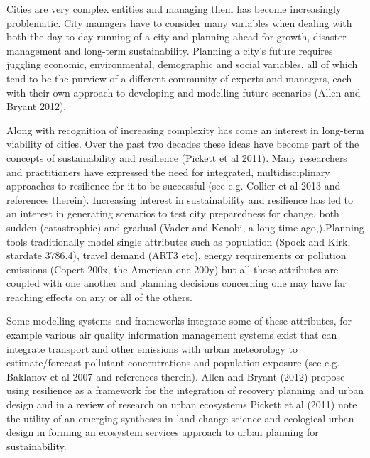 Cities are very complex entities and managing them has become increasingly problematic. City managers have to consider many variables when dealing with both the day-to-day running of a city and planning ahead for growth, disaster management and long-term sustainability. Planning a city’s future requires juggling economic, environmental, demographic and social variables, all of which tend to be the purview of a different community of experts and managers, each with their own approach to developing and modelling future scenarios (Allen and Bryant 2012).


Along with recognition of increasing complexity has come an interest in long-term viability of cities. Over the past two decades these ideas have become part of the concepts of sustainability and resilience (Pickett et al 2011). Many researchers and practitioners have expressed the need for integrated, multidisciplinary approaches to resilience for it to be successful (see e.g. Collier et al 2013 and references therein). Increasing interest in sustainability and resilience has led to an interest in generating scenarios to test city preparedness for change, both sudden (catastrophic) and gradual (Vader and Kenobi, a long time ago,).Planning tools traditionally model single attributes such as population (Spock and Kirk, stardate 3786.4), travel demand (ART3 etc), energy requirements or pollution emissions (Copert 200x, the American one 200y) but all these attributes are coupled with one another and planning decisions concerning one may have far reaching effects on any or all of the others.


Some modelling systems and frameworks integrate some of these attributes, for example various air quality information management systems exist that can integrate transport and other emissions with urban meteorology to estimate/forecast pollutant concentrations and population exposure (see e.g. Baklanov et al 2007 and references therein). Allen and Bryant (2012) propose using resilience as a framework for the integration of recovery planning and urban design and in a review of research on urban ecosystems Pickett et al (2011) note the utility of an emerging syntheses in land change science and ecological urban design in forming an ecosystem services approach to urban planning for sustainability.


